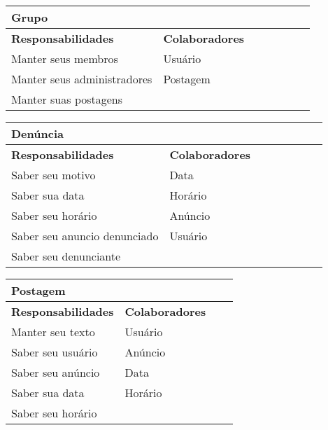\documentclass{article}
\begin{document}
    
    \begin{center}
   	 \begin{tabular}{|p{0.5\linewidth}|p{0.5\linewidth}|}
\hline
 	\multicolumn{2}{|p{\textwidth}|}{
{\large \textbf{Grupo}}
}  \\
\hline
\textbf{Responsabilidades} & \textbf{Colaboradores} \\ 
\hline
  	Manter seus membros & Usuário \\
  	\hline
  	Manter seus administradores & Postagem \\
  	\hline
  	Manter suas postagens & \\
  	\hline
   	\end{tabular} 
    \end{center}
    
    
    \begin{center}
   	 \begin{tabular}{|p{0.5\linewidth}|p{0.5\linewidth}|}
\hline
 	\multicolumn{2}{|p{\textwidth}|}{
{\large \textbf{Denúncia}}
}  \\
\hline
\textbf{Responsabilidades} & \textbf{Colaboradores} \\ 
\hline
  	Saber seu motivo &  Data \\
  	\hline
  	Saber sua data &  Horário \\
  	\hline
  	Saber seu horário &  Anúncio \\
  	\hline
  	Saber seu anuncio denunciado & Usuário \\
  	\hline
  	Saber seu denunciante &  \\
  	\hline
   	\end{tabular} 
    \end{center}
    
    
\begin{center}
 \begin{tabular}{|p{0.5\linewidth}|p{0.5\linewidth}|}
  \hline
  \multicolumn{2}{|p{\textwidth}|}{
   {\large \textbf{Postagem}}} \\
  \hline
  \textbf{Responsabilidades} & \textbf{Colaboradores} \\ 
  \hline
  Manter seu texto &  Usuário \\
  \hline
  Saber seu usuário & Anúncio \\
  \hline
  Saber seu anúncio & Data \\
  \hline
  Saber sua data & Horário \\
  \hline
  Saber seu horário &  \\
  \hline
 
 \end{tabular} 
\end{center}
    
\end{document}
